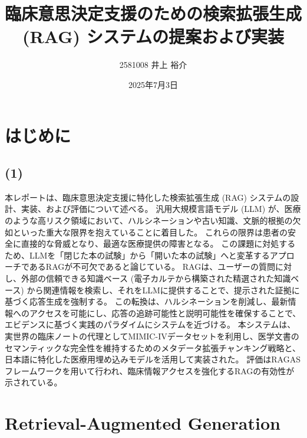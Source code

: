 \documentclass[12pt,a4paper]{jsarticle}
\title{臨床意思決定支援のための検索拡張生成 (RAG) システムの提案および実装}
\author{2581008 \quad 井上 裕介}
\date{2025年7月3日}
\begin{document}
\renewcommand{\figurename}{図}    %
\renewcommand{\tablename}{表}     %
\maketitle                       %


\section{はじめに}
\label{sec:ex1}
\subsection*{(1)}

本レポートは、臨床意思決定支援に特化した検索拡張生成 (RAG) システムの設計、実装、および評価について述べる。
汎用大規模言語モデル (LLM) が、医療のような高リスク領域において、ハルシネーションや古い知識、文脈的根拠の欠如といった重大な限界を抱えていることに着目した。
これらの限界は患者の安全に直接的な脅威となり、最適な医療提供の障害となる。
この課題に対処するため、LLMを「閉じた本の試験」から「開いた本の試験」へと変革するアプローチであるRAGが不可欠であると論じている。
RAGは、ユーザーの質問に対し、外部の信頼できる知識ベース (電子カルテから構築された精選された知識ベース) から関連情報を検索し、それをLLMに提供することで、提示された証拠に基づく応答生成を強制する。
この転換は、ハルシネーションを削減し、最新情報へのアクセスを可能にし、応答の追跡可能性と説明可能性を確保することで、エビデンスに基づく実践のパラダイムにシステムを近づける。
本システムは、実世界の臨床ノートの代理としてMIMIC-IVデータセットを利用し、医学文書のセマンティックな完全性を維持するためのメタデータ拡張チャンキング戦略と、日本語に特化した医療用埋め込みモデルを活用して実装された。
評価はRAGASフレームワークを用いて行われ、臨床情報アクセスを強化するRAGの有効性が示されている。

\section{Retrieval-Augmented Generation}
\label{sec:ex2}
\end{document}
